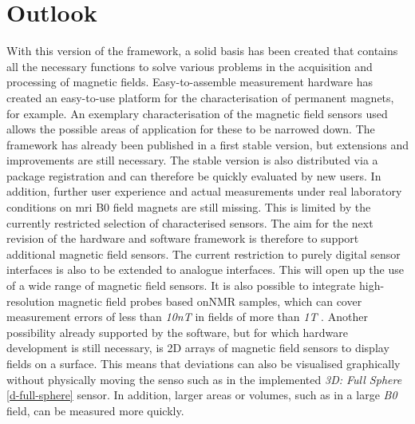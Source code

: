 \hypertarget{outlook}{%
\section{Outlook}\label{outlook}}

With this version of the framework, a solid basis has been created that
contains all the necessary functions to solve various problems in the
acquisition and processing of magnetic fields. Easy-to-assemble
measurement hardware has created an easy-to-use platform for the
characterisation of permanent magnets, for example. An exemplary
characterisation of the magnetic field sensors used allows the possible
areas of application for these to be narrowed down. The framework has
already been published in a first stable version, but extensions and
improvements are still necessary. The stable version is also distributed
via a package registration and can therefore be quickly evaluated by new
users. In addition, further user experience and actual measurements
under real laboratory conditions on \gls{mri} B0 field magnets are still
missing. This is limited by the currently restricted selection of
characterised sensors. The aim for the next revision of the hardware and
software framework is therefore to support additional magnetic field
sensors. The current restriction to purely digital sensor interfaces is
also to be extended to analogue interfaces. This will open up the use of
a wide range of magnetic field sensors. It is also possible to integrate
high-resolution magnetic field probes based onNMR samples, which can
cover measurement errors of less than \emph{10nT} in fields of more than
\emph{1T} . Another possibility already supported by the
software, but for which hardware development is still necessary, is 2D
arrays of magnetic field sensors to display fields on a
surface. This means that deviations can also be
visualised graphically without physically moving the senso such as in
the implemented \emph{3D: Full Sphere} \ref{d-full-sphere} sensor. In
addition, larger areas or volumes, such as in a large \emph{B0} field,
can be measured more quickly.

